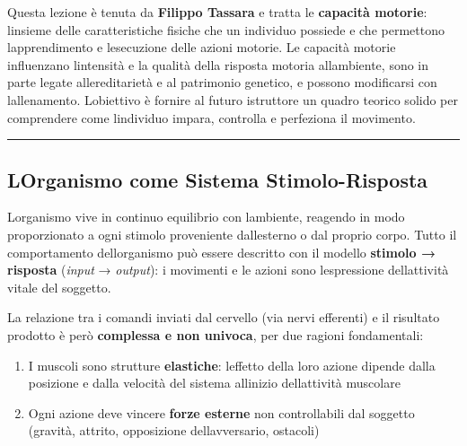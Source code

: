 \documentclass[a4paper,11pt]{article}
\providecommand{\tightlist}{%
  \setlength{\itemsep}{0pt}\setlength{\parskip}{0pt}}
\begin{document}
Questa lezione è tenuta da \textbf{Filippo Tassara} e tratta le
\textbf{capacità motorie}: l\textquotesingle insieme delle
caratteristiche fisiche che un individuo possiede e che permettono
l\textquotesingle apprendimento e l\textquotesingle esecuzione delle
azioni motorie. Le capacità motorie influenzano
l\textquotesingle intensità e la qualità della risposta motoria
all\textquotesingle ambiente, sono in parte legate
all\textquotesingle ereditarietà e al patrimonio genetico, e possono
modificarsi con l\textquotesingle allenamento.
L\textquotesingle obiettivo è fornire al futuro istruttore un quadro
teorico solido per comprendere come l\textquotesingle individuo impara,
controlla e perfeziona il movimento.

\begin{center}\rule{0.5\linewidth}{0.5pt}\end{center}

\subsection{L\textquotesingle Organismo come Sistema
      Stimolo-Risposta}\label{lorganismo-come-sistema-stimolo-risposta}

L\textquotesingle organismo vive in continuo equilibrio con
l\textquotesingle ambiente, reagendo in modo proporzionato a ogni
stimolo proveniente dall\textquotesingle esterno o dal proprio corpo.
Tutto il comportamento dell\textquotesingle organismo può essere
descritto con il modello \textbf{stimolo → risposta} (\emph{input} →
\emph{output}): i movimenti e le azioni sono
l\textquotesingle espressione dell\textquotesingle attività vitale del
soggetto.

La relazione tra i comandi inviati dal cervello (via nervi efferenti) e
il risultato prodotto è però \textbf{complessa e non univoca}, per due
ragioni fondamentali:

\begin{enumerate}
      \tightlist
      \item
            I muscoli sono strutture \textbf{elastiche}: l\textquotesingle effetto
            della loro azione dipende dalla posizione e dalla velocità del sistema
            all\textquotesingle inizio dell\textquotesingle attività muscolare
      \item
            Ogni azione deve vincere \textbf{forze esterne} non controllabili dal
            soggetto (gravità, attrito, opposizione
            dell\textquotesingle avversario, ostacoli)
\end{enumerate}
\end{document}
